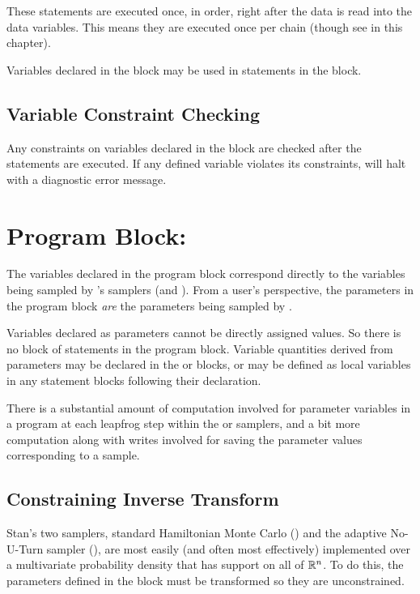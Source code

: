 These statements are executed once, in order, right after the data is
read into the data variables.  This means they are executed once per
chain (though see  in this chapter).

Variables declared in the  block may be used in statements
in the  block.

\subsection{Variable Constraint Checking}

Any constraints on variables declared in the 
block are checked after the statements are executed.  If any defined
variable violates its constraints, \Stan will halt with a diagnostic
error message.


\section{Program Block: }

The variables declared in the  program block
correspond directly to the variables being sampled by \Stan's samplers
(\HMC and \NUTS).  From a user's perspective, the parameters in the
program block \emph{are} the parameters being sampled by \Stan.  

Variables declared as parameters cannot be directly assigned values.
So there is no block of statements in the  program
block.  Variable quantities derived from parameters may be declared in
the  or  blocks,
or may be defined as local variables in any statement blocks following
their declaration.

There is a substantial amount of computation involved for parameter
variables in a \Stan program at each leapfrog step within the
\HMC or \NUTS samplers, and a bit more computation along with writes
involved for saving the parameter values corresponding to a sample.

\subsection{Constraining Inverse Transform}

Stan's two samplers, standard Hamiltonian Monte Carlo (\HMC) and the
adaptive No-U-Turn sampler (\NUTS), are most easily (and often most
effectively) implemented over a multivariate probability density that
has support on all of $\mathbb{R}^n$.  To do this, the parameters
defined in the  block must be transformed so they are
unconstrained. 

